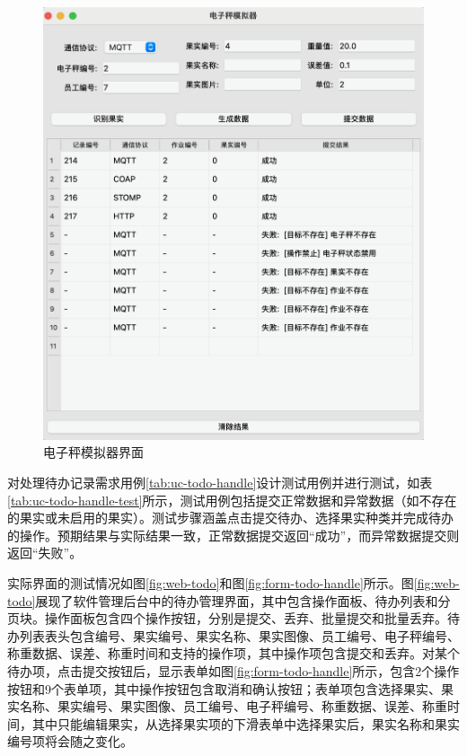 \begin{figure}
    \centering
    \includegraphics[width=0.9\linewidth]{../result/scale-simulator.png}
    \caption{电子秤模拟器界面}
    \label{fig:scale-simulator}
\end{figure}

对处理待办记录需求用例\ref{tab:uc-todo-handle}设计测试用例并进行测试，如表\ref{tab:uc-todo-handle-test}所示，测试用例包括提交正常数据和异常数据（如不存在的果实或未启用的果实）。测试步骤涵盖点击提交待办、选择果实种类并完成待办的操作。预期结果与实际结果一致，正常数据提交返回“成功”，而异常数据提交则返回“失败”。

实际界面的测试情况如图\ref{fig:web-todo}和图\ref{fig:form-todo-handle}所示。图\ref{fig:web-todo}展现了软件管理后台中的待办管理界面，其中包含操作面板、待办列表和分页块。操作面板包含四个操作按钮，分别是提交、丢弃、批量提交和批量丢弃。待办列表表头包含编号、果实编号、果实名称、果实图像、员工编号、电子秤编号、称重数据、误差、称重时间和支持的操作项，其中操作项包含提交和丢弃。对某个待办项，点击提交按钮后，显示表单如图\ref{fig:form-todo-handle}所示，包含2个操作按钮和9个表单项，其中操作按钮包含取消和确认按钮；表单项包含选择果实、果实名称、果实编号、果实图像、员工编号、电子秤编号、称重数据、误差、称重时间，其中只能编辑果实，从选择果实项的下滑表单中选择果实后，果实名称和果实编号项将会随之变化。

